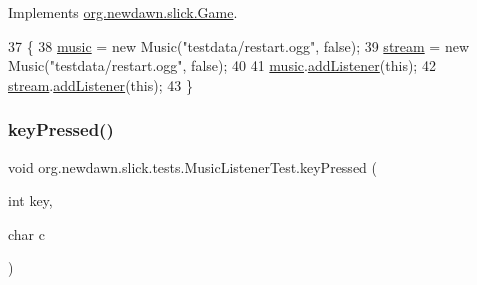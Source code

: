 Implements \mbox{\hyperlink{interfaceorg_1_1newdawn_1_1slick_1_1_game_ad2dd6affab08bb8fdb5fab0815957b7a}{org.\+newdawn.\+slick.\+Game}}.


\begin{DoxyCode}
37                                                                     \{
38         \mbox{\hyperlink{classorg_1_1newdawn_1_1slick_1_1tests_1_1_music_listener_test_a3548ac70c36c26e6f4215ab5f4ef9821}{music}} = \textcolor{keyword}{new} Music(\textcolor{stringliteral}{"testdata/restart.ogg"}, \textcolor{keyword}{false});
39         \mbox{\hyperlink{classorg_1_1newdawn_1_1slick_1_1tests_1_1_music_listener_test_a9e428dbc6b297edff18908dec9c9a305}{stream}} = \textcolor{keyword}{new} Music(\textcolor{stringliteral}{"testdata/restart.ogg"}, \textcolor{keyword}{false});
40         
41         \mbox{\hyperlink{classorg_1_1newdawn_1_1slick_1_1tests_1_1_music_listener_test_a3548ac70c36c26e6f4215ab5f4ef9821}{music}}.\mbox{\hyperlink{classorg_1_1newdawn_1_1slick_1_1_music_a86c7f8a44c5d7a7f3226a1211b7d2b65}{addListener}}(\textcolor{keyword}{this});
42         \mbox{\hyperlink{classorg_1_1newdawn_1_1slick_1_1tests_1_1_music_listener_test_a9e428dbc6b297edff18908dec9c9a305}{stream}}.\mbox{\hyperlink{classorg_1_1newdawn_1_1slick_1_1_music_a86c7f8a44c5d7a7f3226a1211b7d2b65}{addListener}}(\textcolor{keyword}{this});
43     \}
\end{DoxyCode}
\mbox{\label{classorg_1_1newdawn_1_1slick_1_1tests_1_1_music_listener_test_aa57671910286c4275625cddab1b59f9c}} 
\subsubsection{\texorpdfstring{key\+Pressed()}{keyPressed()}}
{\footnotesize\ttfamily void org.\+newdawn.\+slick.\+tests.\+Music\+Listener\+Test.\+key\+Pressed (\begin{DoxyParamCaption}\item[{int}]{key,  }\item[{char}]{c }\end{DoxyParamCaption})\hspace{0.3cm}{\ttfamily [inline]}}

